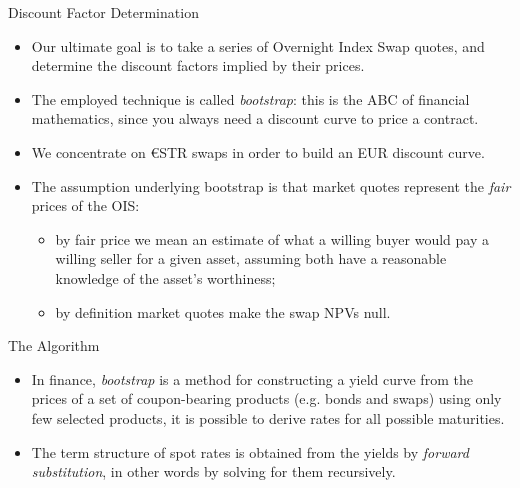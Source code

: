 \documentclass{beamer}
\begin{document}
%        
% 
% 
%
%
%
%
%

\begin{frame}{Discount Factor Determination}
\begin{itemize}
\item Our ultimate goal is to take a series of Overnight Index Swap quotes, and determine the discount factors implied by their prices. 
\item The employed technique is called \emph{bootstrap}: this is the ABC of financial mathematics, since you always need a discount curve to price a contract.
\item We concentrate on €STR swaps in order to build an EUR discount curve.
\item The assumption underlying bootstrap is that market quotes represent the \emph{fair} prices of the OIS:
\begin{itemize}
  \item by fair price we mean an estimate of what a willing buyer would pay a willing seller for a given asset, assuming both have a reasonable knowledge of the asset's worthiness;
  \item by definition market quotes make the swap NPVs null.
  \end{itemize}
  \end{itemize}
\end{frame}  
  
\begin{frame}{The Algorithm}
\begin{itemize} 
\item In finance, \emph{bootstrap} is a method for constructing a yield curve from the prices of a set of coupon-bearing products (e.g. bonds and swaps) using only few selected products, it is possible to derive rates for all possible maturities.
\item The term structure of spot rates is obtained from the yields by \emph{forward substitution}, in other words by solving for them recursively. 
\end{itemize}
\end{frame} 
\end{document}
